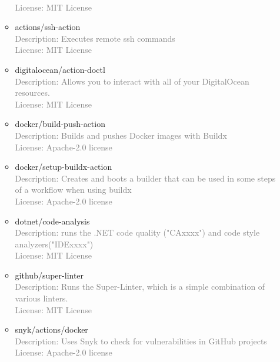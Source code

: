 \documentclass[10pt]{article}
\begin{document}
\begin{itemize}
\begin{itemize}
        \\\textcolor{gray}{License: MIT License}
        \item actions/ssh-action
        \\\textcolor{gray}{Description: Executes remote ssh commands }
        \\\textcolor{gray}{License: MIT License}
        \item digitalocean/action-doctl
        \\\textcolor{gray}{Description: Allows you to interact with all of your DigitalOcean resources. }
        \\\textcolor{gray}{License: MIT License}
        \item docker/build-push-action
        \\\textcolor{gray}{Description: Builds and pushes Docker images with Buildx }
        \\\textcolor{gray}{License: Apache-2.0 license}
        \item docker/setup-buildx-action
        \\\textcolor{gray}{Description: Creates and boots a builder that can be used in some steps of a workflow when using buildx }
        \\\textcolor{gray}{License: Apache-2.0 license}
        \item dotnet/code-analysis
        \\\textcolor{gray}{Description: runs the .NET code quality ("CAxxxx") and code style analyzers("IDExxxx")  }
        \\\textcolor{gray}{License: MIT License}
        \item github/super-linter
        \\\textcolor{gray}{Description: Runs the Super-Linter, which is a simple combination of various linters. }
        \\\textcolor{gray}{License: MIT License}
        \item snyk/actions/docker
        \\\textcolor{gray}{Description: Uses Snyk to check for vulnerabilities in GitHub projects}
        \\\textcolor{gray}{License: Apache-2.0 license}
        
        
    \end{itemize}
    

\end{itemize}
\end{document}
